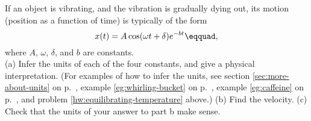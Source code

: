 If an object is vibrating, and the vibration is gradually dying out,
its motion (position as a function of time) is typically of the form
\begin{equation*}
  x(t) = A\cos(\omega t+\delta)e^{-bt}\eqquad,
\end{equation*}
where $A$, $\omega$, $\delta$, and $b$ are constants.\\
(a) Infer the units of each of the four constants, and give a physical interpretation.
(For examples of how to infer the units, see
section \ref{sec:more-about-units} on p.~\pageref{sec:more-about-units},
example \ref{eg:whirling-bucket} on p.~\pageref{eg:whirling-bucket},
example \ref{eg:caffeine} on p.~\pageref{eg:caffeine},
and problem \ref{hw:equilibrating-temperature} above.)
\hwendpart
(b) Find the velocity.\hwendpart
(c) Check that the units of your answer to part b make sense.\answercheck\hwendpart
